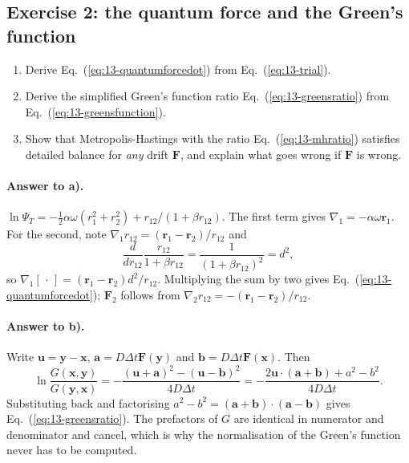 \subsection*{Exercise 2: the quantum force and the Green's function}
\label{ex:13-quantumforce}

\begin{enumerate}
  \item[a)] Derive Eq.~(\ref{eq:13-quantumforcedot}) from
  Eq.~(\ref{eq:13-trial}).
  \item[b)] Derive the simplified Green's function ratio
  Eq.~(\ref{eq:13-greensratio}) from Eq.~(\ref{eq:13-greensfunction}).
  \item[c)] Show that Metropolis-Hastings with the ratio
  Eq.~(\ref{eq:13-mhratio}) satisfies detailed balance for \emph{any} drift
  $\bm{F}$, and explain what goes wrong if $\bm{F}$ is wrong.
\end{enumerate}

\paragraph{Answer to a).}
$\ln\Psi_T = -\tfrac12\alpha\omega(r_1^2+r_2^2) + r_{12}/(1+\beta r_{12})$.
The first term gives $\nabla_1 = -\alpha\omega\bm{r}_1$.  For the second, note
$\nabla_1 r_{12} = (\bm{r}_1-\bm{r}_2)/r_{12}$ and
\[
  \frac{d}{dr_{12}}\frac{r_{12}}{1+\beta r_{12}}
   = \frac{1}{(1+\beta r_{12})^2} = d^2 ,
\]
so $\nabla_1[\,\cdot\,] = (\bm{r}_1-\bm{r}_2)d^2/r_{12}$.  Multiplying the sum
by two gives Eq.~(\ref{eq:13-quantumforcedot}); $\bm{F}_2$ follows from
$\nabla_2 r_{12} = -(\bm{r}_1-\bm{r}_2)/r_{12}$.

\paragraph{Answer to b).}
Write $\bm{u}=\bm{y}-\bm{x}$, $\bm{a}=D\Delta t\bm{F}(\bm{y})$ and
$\bm{b}=D\Delta t\bm{F}(\bm{x})$.  Then
\[
  \ln\frac{G(\bm{x},\bm{y})}{G(\bm{y},\bm{x})}
   = -\frac{(\bm{u}+\bm{a})^2 - (\bm{u}-\bm{b})^2}{4D\Delta t}
   = -\frac{2\bm{u}\cdot(\bm{a}+\bm{b}) + a^2 - b^2}{4D\Delta t}.
\]
Substituting back and factorising $a^2-b^2=(\bm{a}+\bm{b})\cdot
(\bm{a}-\bm{b})$ gives Eq.~(\ref{eq:13-greensratio}).  The prefactors of $G$
are identical in numerator and denominator and cancel, which is why the
normalisation of the Green's function never has to be computed.

